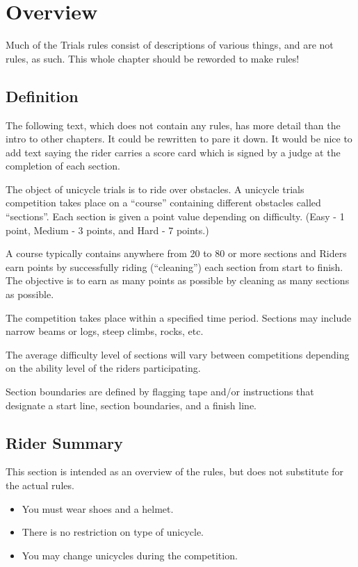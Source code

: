 \chapter{Overview}

\begin{comment2016}
Much of the Trials rules consist of descriptions of various things, and are not rules, as such.
This whole chapter should be reworded to make rules!
\end{comment2016}

\section{Definition}

\begin{comment2016}
The following text, which does not contain any rules, has more detail than the intro to other chapters.
It could be rewritten to pare it down.
It would be nice to add text saying the rider carries a score card which is signed by a judge at the completion of each section.
\end{comment2016}

The object of unicycle trials is to ride over obstacles.
A unicycle trials competition takes place on a ``course'' containing different obstacles called ``sections''.
Each section is given a point value depending on difficulty. (Easy - 1 point, Medium - 3 points, and Hard - 7 points.)

A course typically contains anywhere from 20 to 80 or more sections and Riders earn points by successfully riding (``cleaning'') each section from start to finish.
The objective is to earn as many points as possible by cleaning as many sections as possible.

The competition takes place within a specified time period.
Sections may include narrow beams or logs, steep climbs, rocks, etc.

The average difficulty level of sections will vary between competitions depending on the ability level of the riders participating.

Section boundaries are defined by flagging tape and/or instructions that designate a start line, section boundaries, and a finish line.

\section{Rider Summary}

This section is intended as an overview of the rules, but does not substitute for the actual rules.
\begin{itemize}
\item You must wear shoes and a helmet.
\item There is no restriction on type of unicycle.
\item You may change unicycles during the competition.
\end{itemize}
